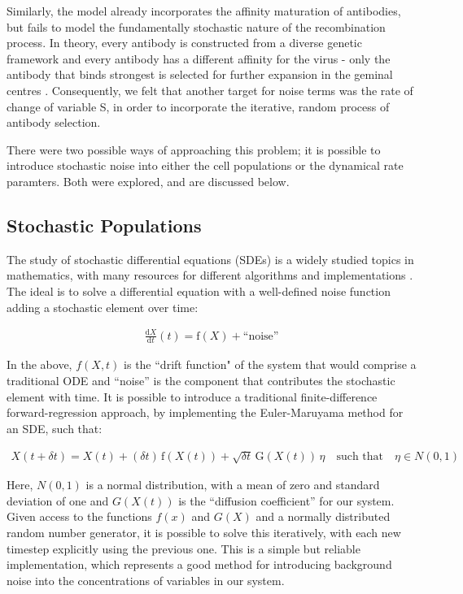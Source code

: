 \documentclass[a4paper, 12pt]{report}
\begin{document}
Similarly, the model already incorporates the affinity maturation of antibodies, but fails to model the fundamentally stochastic nature of the recombination process. In theory, every antibody is constructed from a diverse genetic framework and every antibody has a different affinity for the virus - only the antibody that binds strongest is selected for further expansion in the geminal centres \cite{Grimaldi15022005}. Consequently, we felt that another target for noise terms was the rate of change of variable S, in order to incorporate the iterative, random process of antibody selection.

There were two possible ways of approaching this problem; it is possible to introduce stochastic noise into either the cell populations or the dynamical rate paramters. Both were explored, and are discussed below.

\subsection{Stochastic Populations}

The study of stochastic differential equations (SDEs) is a widely studied topics in mathematics, with many resources for different algorithms and implementations \cite{2001}. The ideal is to solve a differential equation with a well-defined noise function adding a stochastic element over time:

\begin{align}
\frac{\mathrm d X}{\mathrm d t}(t) = \mathrm f (X) + \text{``noise''}
\end{align}

In the above, $f(X,t)$ is the ``drift function" of the system that would comprise a traditional ODE and ``noise'' is the component that contributes the stochastic element with time. It is possible to introduce a traditional finite-difference forward-regression approach, by implementing the Euler-Maruyama method for an SDE, such that:

\begin{align}
X(t+\delta t) = X(t) + (\delta t)\, \mathrm f (X(t)) + \sqrt{ \delta t}\, \mathrm G (X(t))\, \eta \quad \text{such that} \quad \eta \in N(0,1)
\end{align}

Here, $N(0,1)$ is a normal distribution, with a mean of zero and standard deviation of one and $G(X(t))$ is the ``diffusion coefficient'' for our system. Given access to the functions $f(x)$ and $G(X)$ and a normally distributed random number generator, it is possible to solve this iteratively, with each new timestep explicitly using the previous one. This is a simple but reliable implementation, which represents a good method for introducing background noise into the concentrations of variables in our system.
\end{document}
